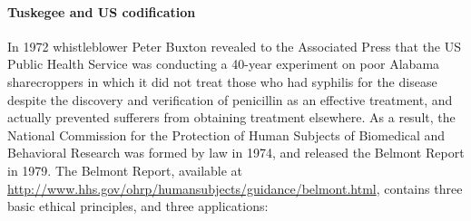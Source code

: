 \documentclass[12pt] {article}
\begin{document}
\paragraph{Tuskegee and US
codification}\label{tuskegee-and-us-codification}

In 1972 whistleblower Peter Buxton revealed to the Associated Press that
the US Public Health Service was conducting a 40-year experiment on poor
Alabama sharecroppers in which it did not treat those who had syphilis
for the disease despite the discovery and verification of penicillin as
an effective treatment, and actually prevented sufferers from obtaining
treatment elsewhere. As a result, the National Commission for the
Protection of Human Subjects of Biomedical and Behavioral Research was
formed by law in 1974, and released the Belmont Report in 1979. The
Belmont Report, available at
\url{http://www.hhs.gov/ohrp/humansubjects/guidance/belmont.html},
contains three basic ethical principles, and three applications:
\end{document}
